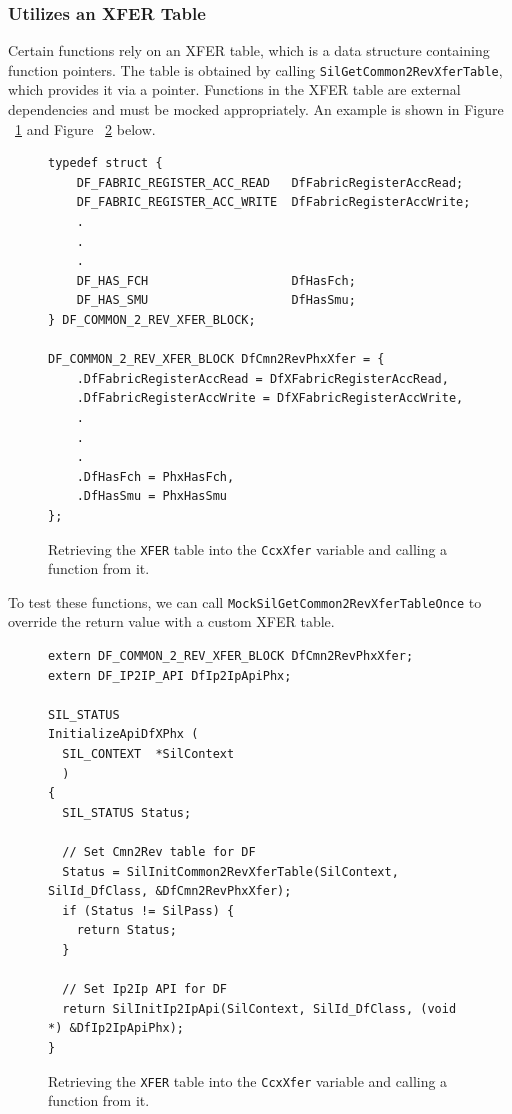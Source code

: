 \documentclass[conference]{IEEEtran}
\begin{document}
\subsubsection*{\textbf{Utilizes an XFER Table}}
Certain functions rely on an XFER table, which is a data structure containing function pointers. The table is obtained by calling \texttt{SilGetCommon2RevXferTable}, which provides it via a pointer. Functions in the XFER table are external dependencies and must be mocked appropriately. An example is shown in Figure ~\ref{fig:xfer_struct} and  Figure ~\ref{fig:xfer_example} below.

{ \small
\begin{figure}[hbt!]
  \centering
  \begin{lstlisting}[style=cstyle]
typedef struct {
    DF_FABRIC_REGISTER_ACC_READ   DfFabricRegisterAccRead;
    DF_FABRIC_REGISTER_ACC_WRITE  DfFabricRegisterAccWrite;
    .
    .
    .
    DF_HAS_FCH                    DfHasFch;
    DF_HAS_SMU                    DfHasSmu;
} DF_COMMON_2_REV_XFER_BLOCK;

DF_COMMON_2_REV_XFER_BLOCK DfCmn2RevPhxXfer = {
    .DfFabricRegisterAccRead = DfXFabricRegisterAccRead,
    .DfFabricRegisterAccWrite = DfXFabricRegisterAccWrite,
    .
    .
    .
    .DfHasFch = PhxHasFch,
    .DfHasSmu = PhxHasSmu
};
  \end{lstlisting}
  \caption{Retrieving the \texttt{XFER} table into the \texttt{CcxXfer} variable and calling a function from it.}
  \label{fig:xfer_struct}
\end{figure}
}

To test these functions, we can call \texttt{MockSilGetCommon2RevXferTableOnce} to override the return value with a custom XFER table.

\begin{figure}[hbt!]
  \centering
  \begin{lstlisting}[style=cstyle]
extern DF_COMMON_2_REV_XFER_BLOCK DfCmn2RevPhxXfer;
extern DF_IP2IP_API DfIp2IpApiPhx;

SIL_STATUS
InitializeApiDfXPhx (
  SIL_CONTEXT  *SilContext
  )
{
  SIL_STATUS Status;

  // Set Cmn2Rev table for DF
  Status = SilInitCommon2RevXferTable(SilContext, SilId_DfClass, &DfCmn2RevPhxXfer);
  if (Status != SilPass) {
    return Status;
  }

  // Set Ip2Ip API for DF
  return SilInitIp2IpApi(SilContext, SilId_DfClass, (void *) &DfIp2IpApiPhx);
}
  \end{lstlisting}
  \caption{Retrieving the \texttt{XFER} table into the \texttt{CcxXfer} variable and calling a function from it.}
  \label{fig:xfer_example}
\end{figure}
\end{document}
